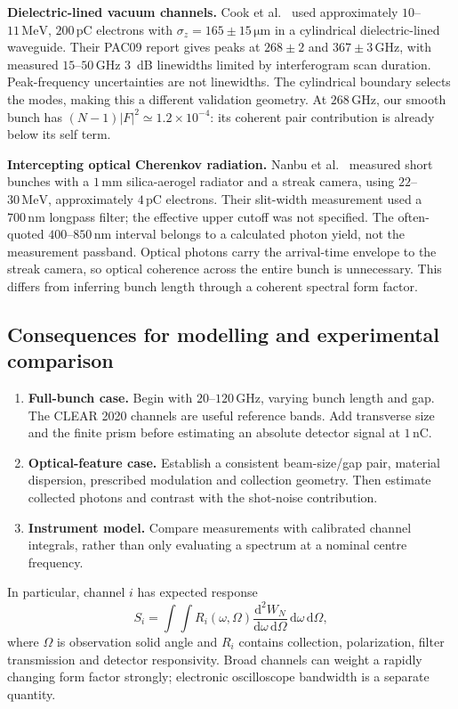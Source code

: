 \documentclass[11pt,a4paper]{article}
\newcommand{\dd}{\mathrm d}
\newcommand{\unit}[1]{\,\mathrm{#1}}
\numberwithin{equation}{section}
\begin{document}
\textbf{Dielectric-lined vacuum channels.}
Cook et al.~\cite{cook2009narrowband,cook2009pac} used approximately
\(10\)--\(11\unit{MeV}\), \(200\unit{pC}\) electrons with
\(\sigma_z=165\pm15\unit{\mu m}\) in a cylindrical dielectric-lined
waveguide. Their PAC09 report gives peaks at \(268\pm2\) and
\(367\pm3\unit{GHz}\), with measured \(15\)--\(50\unit{GHz}\)
3~dB linewidths limited by interferogram scan duration. Peak-frequency
uncertainties are not linewidths. The cylindrical boundary selects the
modes, making this a different validation geometry. At
\(268\unit{GHz}\), our smooth bunch has
\((N-1)|F|^2\simeq1.2\times10^{-4}\): its coherent pair contribution
is already below its self term.

\textbf{Intercepting optical Cherenkov radiation.}
Nanbu et al.~\cite{nanbu2018aerogel} measured short bunches with a
\(1\unit{mm}\) silica-aerogel radiator and a streak camera, using
\(22\)--\(30\unit{MeV}\), approximately \(4\unit{pC}\) electrons.
Their slit-width measurement used a \(700\unit{nm}\) longpass filter;
the effective upper cutoff was not specified. The often-quoted
\(400\)--\(850\unit{nm}\) interval belongs to a calculated photon
yield, not the measurement passband. Optical photons carry the
arrival-time envelope to the streak camera, so optical coherence across
the entire bunch is unnecessary. This differs from inferring bunch
length through a coherent spectral form factor.

\subsection{Consequences for modelling and experimental comparison}

\begin{enumerate}[itemsep=5pt]
 \item \textbf{Full-bunch case.} Begin with \(20\)--\(120\unit{GHz}\),
       varying bunch length and gap. The CLEAR 2020 channels are useful
       reference bands. Add transverse size and the finite prism before
       estimating an absolute detector signal at \(1\unit{nC}\).
 \item \textbf{Optical-feature case.} Establish a consistent beam-size/gap
       pair, material dispersion, prescribed modulation and collection
       geometry. Then estimate collected photons and contrast with the
       shot-noise contribution.
 \item \textbf{Instrument model.} Compare measurements with calibrated
       channel integrals, rather than only evaluating a spectrum at a
       nominal centre frequency.
\end{enumerate}
In particular, channel \(i\) has expected response
\begin{equation}
 S_i=\int\!\int R_i(\omega,\Omega)
 \frac{\dd^2W_N}{\dd\omega\,\dd\Omega}
 \,\dd\omega\,\dd\Omega,
 \label{eq:measurement-channel-response}
\end{equation}
where \(\Omega\) is observation solid angle and \(R_i\) contains
collection, polarization, filter transmission and detector responsivity.
Broad channels can weight a rapidly changing form factor strongly;
electronic oscilloscope bandwidth is a separate quantity.
\end{document}
